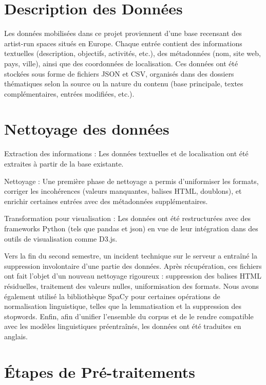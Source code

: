 \documentclass[mstat,12pt]{unswthesis}
\begin{document}
\hypertarget{description-des-donnuxe9es}{%
\section{Description des Données}\label{description-des-donnuxe9es}}

Les données mobilisées dans ce projet proviennent d’une base recensant des artist-run spaces situés en Europe. Chaque entrée contient des informations textuelles (description, objectifs, activités, etc.), des métadonnées (nom, site web, pays, ville), ainsi que des coordonnées de localisation.
Ces données ont été stockées sous forme de fichiers JSON et CSV, organisés dans des dossiers thématiques selon la source ou la nature du contenu (base principale, textes complémentaires, entrées modifiées, etc.).

\hypertarget{nettoyage-des-donnuxe9es}{%
\section{Nettoyage des données}\label{nettoyage-des-donnuxe9es}}

Extraction des informations : Les données textuelles et de localisation ont été extraites à partir de la base existante.

Nettoyage : Une première phase de nettoyage a permis d’uniformiser les formats, corriger les incohérences (valeurs manquantes, balises HTML, doublons), et enrichir certaines entrées avec des métadonnées supplémentaires.

Transformation pour visualisation : Les données ont été restructurées avec des frameworks Python (tels que pandas et json) en vue de leur intégration dans des outils de visualisation comme D3.js.

Vers la fin du second semestre, un incident technique sur le serveur a entraîné la suppression involontaire d’une partie des données. Après récupération, ces fichiers ont fait l’objet d’un nouveau nettoyage rigoureux : suppression des balises HTML résiduelles, traitement des valeurs nulles, uniformisation des formats. Nous avons également utilisé la bibliothèque SpaCy pour certaines opérations de normalisation linguistique, telles que la lemmatisation et la suppression des stopwords. Enfin, afin d’unifier l’ensemble du corpus et de le rendre compatible avec les modèles linguistiques préentraînés, les données ont été traduites en anglais.

\hypertarget{uxe9tapes-de-pruxe9-traitements}{%
\section{Étapes de
Pré-traitements}\label{uxe9tapes-de-pruxe9-traitements}}
\end{document}
